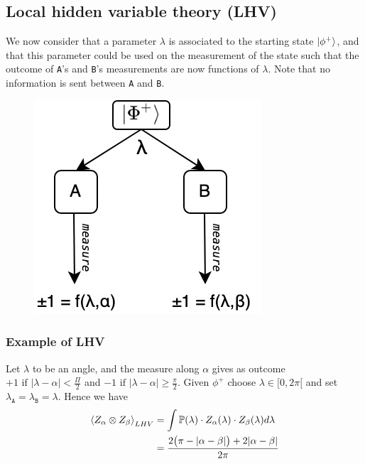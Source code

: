 \documentclass{article}
\begin{document}
\subsection{Local hidden variable theory (LHV)}
We now consider that a parameter $\lambda$ is associated to the starting state
$\ket{\phi^+}$, and that this parameter could be used on the measurement of the
state such that the outcome of \texttt{A}'s and \texttt{B}'s measurements are
now functions of $\lambda$. Note that no information is sent between \texttt{A}
and \texttt{B}.

\begin{figure}[h]
    \centering
    \includegraphics[scale=0.4]{bell-ineq-sharing-scheme-lhv.jpeg}
    \caption{}
\end{figure}
\subsubsection*{Example of LHV}
Let $\lambda$ to be an angle, and the measure along $\alpha$ gives as outcome
$+1 \text{ if } |\lambda - \alpha | < \frac{\Pi}{2}$ and $-1 \text{ if }
|\lambda - \alpha | \geq \frac{\pi}{2}$. Given $\phi^+$ choose $ \lambda \in [0,
2\pi[$ and set $\lambda_\texttt{A} = \lambda_\texttt{B} = \lambda$. Hence we
have
\begin{equation}
    \begin{aligned}
        \braket{Z_\alpha \otimes Z_\beta}_{LHV}
            & = \int\mathbb{P}(\lambda) \cdot Z_\alpha(\lambda) \cdot Z_\beta(\lambda) d\lambda \\
            & = \frac{2\big(\pi - |\alpha - \beta|\big) + 2|\alpha-\beta|}{2\pi}
    \end{aligned}
\end{equation}

\end{document}
